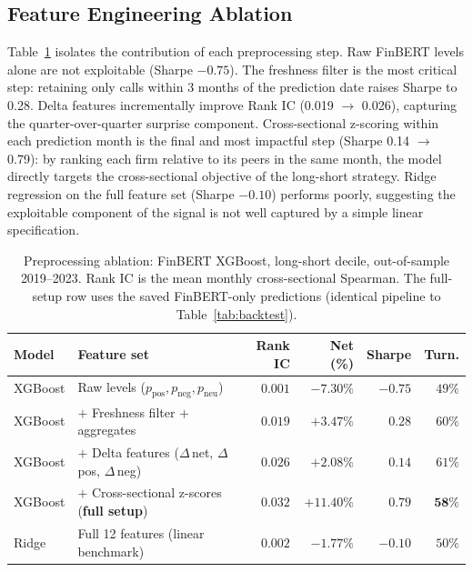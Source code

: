\subsection{Feature Engineering Ablation}
\label{sec:results}

Table~\ref{tab:preproc} isolates the contribution of each preprocessing step. Raw FinBERT levels alone are not exploitable (Sharpe $-0.75$). The freshness filter is the most critical step: retaining only calls within 3 months of the prediction date raises Sharpe to 0.28. Delta features incrementally improve Rank IC (0.019 $\to$ 0.026), capturing the quarter-over-quarter surprise component. Cross-sectional z-scoring within each prediction month is the final and most impactful step (Sharpe 0.14 $\to$ 0.79): by ranking each firm relative to its peers in the same month, the model directly targets the cross-sectional objective of the long-short strategy. Ridge regression on the full feature set (Sharpe $-0.10$) performs poorly, suggesting the exploitable component of the signal is not well captured by a simple linear specification.

\begin{table}[H]
\centering
\caption{Preprocessing ablation: FinBERT XGBoost, long-short decile, out-of-sample 2019--2023. Rank IC is the mean monthly cross-sectional Spearman. The full-setup row uses the saved FinBERT-only predictions (identical pipeline to Table~\ref{tab:backtest}).}
\label{tab:preproc}
\setlength{\tabcolsep}{6pt}
\begin{tabular}{llrrrr}
\toprule
\textbf{Model} & \textbf{Feature set} & \textbf{Rank IC} & \textbf{Net (\%)} & \textbf{Sharpe} & \textbf{Turn.} \\
\midrule
XGBoost & Raw levels ($p_\text{pos}, p_\text{neg}, p_\text{neu}$)         & $0.001$ & $-7.30\%$ & $-0.75$ & $49\%$ \\
XGBoost & $+$ Freshness filter $+$ aggregates                              & $0.019$ & $+3.47\%$ & $0.28$ & $60\%$ \\
XGBoost & $+$ Delta features ($\Delta$\,net, $\Delta$\,pos, $\Delta$\,neg) & $0.026$ & $+2.08\%$ & $0.14$ & $61\%$ \\
\rowcolor{lightgray}
XGBoost & $+$ Cross-sectional z-scores (\textbf{full setup})               & $\mathbf{0.032}$ & $\mathbf{+11.40\%}$ & $\mathbf{0.79}$ & $\mathbf{58\%}$ \\
\midrule
Ridge   & Full 12 features (linear benchmark)                              & $0.002$ & $-1.77\%$ & $-0.10$ & $50\%$ \\
\bottomrule
\end{tabular}
\end{table}

